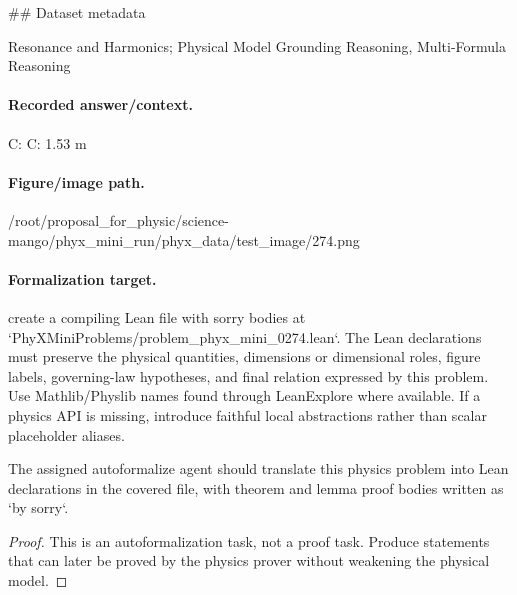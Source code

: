 \#\# Dataset metadata

Resonance and Harmonics; Physical Model Grounding Reasoning, Multi-Formula Reasoning

\paragraph{Recorded answer/context.}
C: C: 1.53 m

\paragraph{Figure/image path.}
/root/proposal\_for\_physic/science-mango/phyx\_mini\_run/phyx\_data/test\_image/274.png

\paragraph{Formalization target.}
create a compiling Lean file with sorry bodies at `PhyXMiniProblems/problem\_phyx\_mini\_0274.lean`. The Lean declarations must preserve the physical quantities, dimensions or dimensional roles, figure labels, governing-law hypotheses, and final relation expressed by this problem.
Use Mathlib/Physlib names found through LeanExplore where available. If a physics API is missing, introduce faithful local abstractions rather than scalar placeholder aliases.

\begin{theorem}
\label{thm:physics:phyx_mini_0274:target}
The assigned autoformalize agent should translate this physics problem into Lean declarations in the covered file, with theorem and lemma proof bodies written as `by sorry`.
\end{theorem}
\begin{proof}
This is an autoformalization task, not a proof task. Produce statements that can later be proved by the physics prover without weakening the physical model.
\end{proof}

